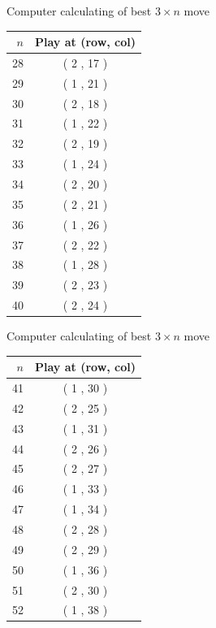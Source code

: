\documentclass{beamer}
\begin{document}
\begin{frame}{Computer calculating of best $3\times n$ move}
\begin{center}
\begin{tabular}{r|c}
\hline
$n$ & Play at (row, col) \\
\hline
28  & ( 2 , 17 ) \\
29  & ( 1 , 21 ) \\
30  & ( 2 , 18 ) \\
31  & ( 1 , 22 ) \\
32  & ( 2 , 19 ) \\
33  & ( 1 , 24 ) \\
34  & ( 2 , 20 ) \\
35  & ( 2 , 21 ) \\
36  & ( 1 , 26 ) \\
37  & ( 2 , 22 ) \\
38  & ( 1 , 28 ) \\
39  & ( 2 , 23 ) \\
40  & ( 2 , 24 ) \\
\end{tabular}
\end{center}
\end{frame}
\begin{frame}{Computer calculating of best $3\times n$ move}
\begin{center}
\begin{tabular}{r|c}
\hline
$n$ & Play at (row, col) \\
\hline
41  & ( 1 , 30 ) \\
42  & ( 2 , 25 ) \\
43  & ( 1 , 31 ) \\
44  & ( 2 , 26 ) \\
45  & ( 2 , 27 ) \\
46  & ( 1 , 33 ) \\
47  & ( 1 , 34 ) \\
48  & ( 2 , 28 ) \\
49  & ( 2 , 29 ) \\
50  & ( 1 , 36 ) \\
51  & ( 2 , 30 ) \\
52  & ( 1 , 38 ) \\
\end{tabular}
\end{center}
\end{frame}
\end{document}
